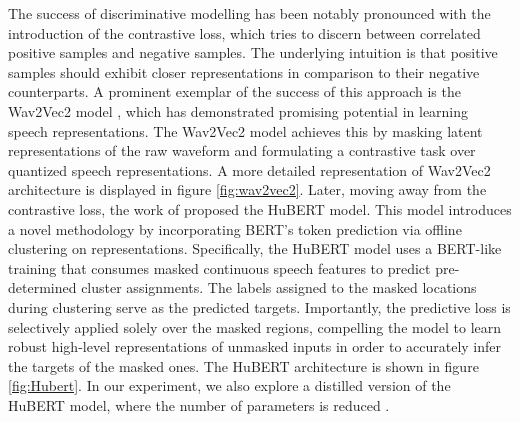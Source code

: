 The success of discriminative modelling has been notably pronounced with the introduction of the contrastive loss, which tries to discern between correlated positive samples and negative samples. The underlying intuition is that positive samples should exhibit closer representations in comparison to their negative counterparts. A prominent exemplar of the success of this approach is the Wav2Vec2 model \cite{baevski2020wav2vec}, which has demonstrated promising potential in learning speech representations. The Wav2Vec2 model achieves this by masking latent representations of the raw waveform and formulating a contrastive task over quantized speech representations. A more detailed representation of Wav2Vec2 architecture is displayed in figure \ref{fig:wav2vec2}. Later, moving away from the contrastive loss, the work of \cite{hsu2021hubert} proposed the HuBERT model. This model introduces a novel methodology by incorporating BERT's token prediction via offline clustering on representations. Specifically, the HuBERT model uses a \ac{BERT}-like training that consumes masked continuous speech features to predict pre-determined cluster assignments. The labels assigned to the masked locations during clustering serve as the predicted targets. Importantly, the predictive loss is selectively applied solely over the masked regions, compelling the model to learn robust high-level representations of unmasked inputs in order to accurately infer the targets of the masked ones. The HuBERT architecture is shown in figure \ref{fig:Hubert}. In our experiment, we also explore a distilled version of the HuBERT model, where the number of parameters is reduced \cite{chang2022distilhubert}.

